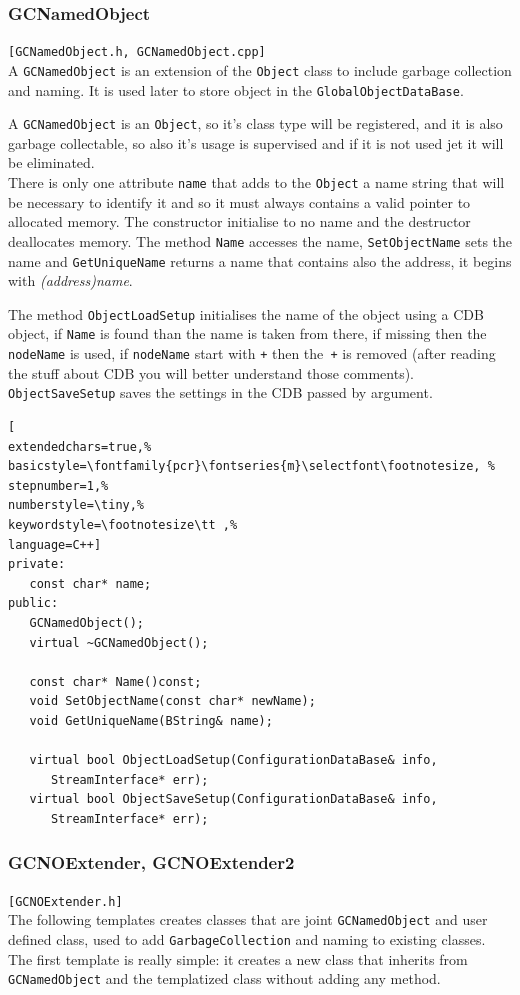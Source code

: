 \subsubsection{GCNamedObject}
\texttt{[GCNamedObject.h, GCNamedObject.cpp]}\\
A \texttt{GCNamedObject} is an extension of the \texttt{Object} class to include garbage collection and naming. It is used later to store object in the \texttt{GlobalObjectDataBase}.

A \texttt{GCNamedObject} is an \texttt{Object}, so it's class type will be registered, and it is also garbage collectable, so also it's usage is supervised and if it is not used jet it will be eliminated.\\


There is only one attribute \texttt{name} that adds to the \texttt{Object} a name string that will be necessary to identify it and so it must always contains a valid pointer to allocated memory. The constructor initialise to no name and the destructor deallocates memory.
The method \texttt{Name} accesses the name, \texttt{SetObjectName} sets the name and \texttt{GetUniqueName} returns a name that contains also the address, it begins with \textit{(address)name}.

The method \texttt{ObjectLoadSetup} initialises the name of the object using a CDB object, if \texttt{Name} is found than the name is taken from there, if missing then the \texttt{nodeName} is used, if \texttt{nodeName} start with \texttt{+} then the\texttt{ +} is removed (after reading the stuff about CDB you will better understand those comments). \texttt{ObjectSaveSetup} saves the settings in the CDB passed by argument.

\begin{lstlisting}[
extendedchars=true,%
basicstyle=\fontfamily{pcr}\fontseries{m}\selectfont\footnotesize, %
stepnumber=1,%
numberstyle=\tiny,%
keywordstyle=\footnotesize\tt ,%
language=C++]
private:
   const char* name;
public:
   GCNamedObject();
   virtual ~GCNamedObject();

   const char* Name()const;
   void SetObjectName(const char* newName);
   void GetUniqueName(BString& name);

   virtual bool ObjectLoadSetup(ConfigurationDataBase& info,
      StreamInterface* err);
   virtual bool ObjectSaveSetup(ConfigurationDataBase& info,
      StreamInterface* err);
\end{lstlisting}



\subsubsection{GCNOExtender, GCNOExtender2}
\texttt{[GCNOExtender.h]}\\
The following templates creates classes that are joint \texttt{GCNamedObject} and user defined class, used to add \texttt{GarbageCollection} and naming to existing classes. The first template is really simple: it creates a new class that inherits from \texttt{GCNamedObject} and the templatized class without adding any method.

